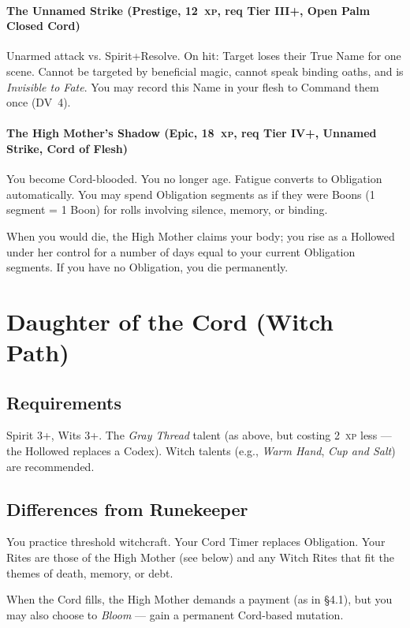 \documentclass[10pt,twoside]{book}
\newcommand{\dv}[1]{\textsc{DV}~#1}
\newcommand{\xp}[1]{#1~\textsc{xp}}
\begin{document}
\paragraph{The Unnamed Strike (Prestige, \xp{12}, req Tier III+, Open Palm Closed Cord)}
Unarmed attack vs. Spirit+Resolve. On hit: Target loses their True Name for one scene. Cannot be targeted by beneficial magic, cannot speak binding oaths, and is \textit{Invisible to Fate}. You may record this Name in your flesh to Command them once (\dv{4}).

\paragraph{The High Mother's Shadow (Epic, \xp{18}, req Tier IV+, Unnamed Strike, Cord of Flesh)}
You become Cord-blooded. You no longer age. Fatigue converts to Obligation automatically. You may spend Obligation segments as if they were Boons (1 segment = 1 Boon) for rolls involving silence, memory, or binding.

When you would die, the High Mother claims your body; you rise as a Hollowed under her control for a number of days equal to your current Obligation segments. If you have no Obligation, you die permanently.

\section{Daughter of the Cord (Witch Path)}

\subsection*{Requirements}
Spirit 3+, Wits 3+. The \textit{Gray Thread} talent (as above, but costing \xp{2} less --- the Hollowed replaces a Codex). Witch talents (e.g., \textit{Warm Hand}, \textit{Cup and Salt}) are recommended.

\subsection*{Differences from Runekeeper}
You practice threshold witchcraft. Your Cord Timer replaces Obligation. Your Rites are those of the High Mother (see below) and any Witch Rites that fit the themes of death, memory, or debt.

When the Cord fills, the High Mother demands a payment (as in §4.1), but you may also choose to \textit{Bloom} --- gain a permanent Cord-based mutation.
\end{document}
